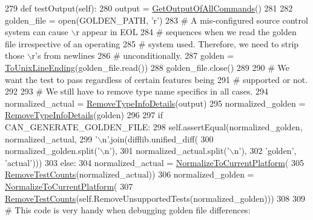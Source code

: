 \begin{DoxyCode}
279   \textcolor{keyword}{def }testOutput(self):
280     output = \hyperlink{namespacegtest__output__test_a9d88a4a9a91b97a369abac2170a23ebe}{GetOutputOfAllCommands}()
281 
282     golden\_file = open(GOLDEN\_PATH, \textcolor{stringliteral}{'r')}
283 \textcolor{stringliteral}{    }\textcolor{comment}{# A mis-configured source control system can cause \(\backslash\)r appear in EOL}
284     \textcolor{comment}{# sequences when we read the golden file irrespective of an operating}
285     \textcolor{comment}{# system used. Therefore, we need to strip those \(\backslash\)r's from newlines}
286     \textcolor{comment}{# unconditionally.}
287     golden = \hyperlink{namespacegtest__output__test_aa9ee981e855b986a7fc513a4ab68dd3e}{ToUnixLineEnding}(golden\_file.read())
288     golden\_file.close()
289 
290     \textcolor{comment}{# We want the test to pass regardless of certain features being}
291     \textcolor{comment}{# supported or not.}
292 
293     \textcolor{comment}{# We still have to remove type name specifics in all cases.}
294     normalized\_actual = \hyperlink{namespacegtest__output__test_addbdacea2fbdaacb3a0328425b3218c9}{RemoveTypeInfoDetails}(output)
295     normalized\_golden = \hyperlink{namespacegtest__output__test_addbdacea2fbdaacb3a0328425b3218c9}{RemoveTypeInfoDetails}(golden)
296 
297     \textcolor{keywordflow}{if} CAN\_GENERATE\_GOLDEN\_FILE:
298       self.assertEqual(normalized\_golden, normalized\_actual,
299                        \textcolor{stringliteral}{'\(\backslash\)n'}.join(difflib.unified\_diff(
300                            normalized\_golden.split(\textcolor{stringliteral}{'\(\backslash\)n'}),
301                            normalized\_actual.split(\textcolor{stringliteral}{'\(\backslash\)n'}),
302                            \textcolor{stringliteral}{'golden'}, \textcolor{stringliteral}{'actual'})))
303     \textcolor{keywordflow}{else}:
304       normalized\_actual = \hyperlink{namespacegtest__output__test_a597325056856f8805a518c2952a3233e}{NormalizeToCurrentPlatform}(
305           \hyperlink{namespacegtest__output__test_a74ae74aaa09cc2651aabbec468a878d9}{RemoveTestCounts}(normalized\_actual))
306       normalized\_golden = \hyperlink{namespacegtest__output__test_a597325056856f8805a518c2952a3233e}{NormalizeToCurrentPlatform}(
307           \hyperlink{namespacegtest__output__test_a74ae74aaa09cc2651aabbec468a878d9}{RemoveTestCounts}(self.RemoveUnsupportedTests(normalized\_golden)))
308 
309       \textcolor{comment}{# This code is very handy when debugging golden file differences:}

\end{DoxyCode}
